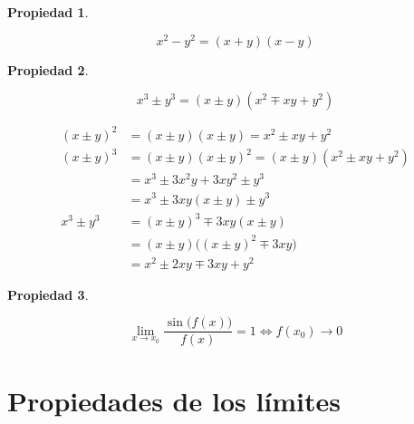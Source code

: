 \documentclass[a5paper,12pt,twoside]{book}
\newtheorem{prop}{{Propiedad}}[chapter]
\begin{document}

\begin{mdframed}[style=PropertyFrame]
    \begin{prop}
    \end{prop}
    \begin{equation*}
        x^2-y^2 = (x+y)(x-y)
    \end{equation*}
\end{mdframed}

\begin{mdframed}[style=PropertyFrame]
    \begin{prop}
    \end{prop}
    \begin{equation*}
        x^3 \pm y^3 = (x \pm y)(x^2 \mp xy + y^2)
    \end{equation*}
\end{mdframed}

\begin{align*}
(x \pm y)^2 &= (x \pm y)(x \pm y)=x^2 \pm xy + y^2
\\
(x \pm y)^3 &= (x \pm y)(x \pm y)^2=(x \pm y)(x^2 \pm xy + y^2)
\\
&= x^3 \pm 3x^2y + 3xy^2 \pm y^3
\\
&= x^3 \pm 3xy(x \pm y) \pm y^3
\\
x^3 \pm y^3 &= (x \pm y)^3 \mp 3xy(x\pm y)
\\
&= (x \pm y) \Big( (x\pm y)^2 \mp 3xy \Big)
\\
&= x^2 \pm 2xy \mp 3xy + y^2
\end{align*}


\begin{mdframed}[style=PropertyFrame]
    \begin{prop}
    \end{prop}
    \begin{equation*}
        \lim_{x \to x_0} \dfrac{\sin{\Big( f(x) \Big)}}{f(x)} = 1 \iff f(x_0) \rightarrow 0
    \end{equation*}
\end{mdframed}


\section{Propiedades de los límites}
\end{document}
